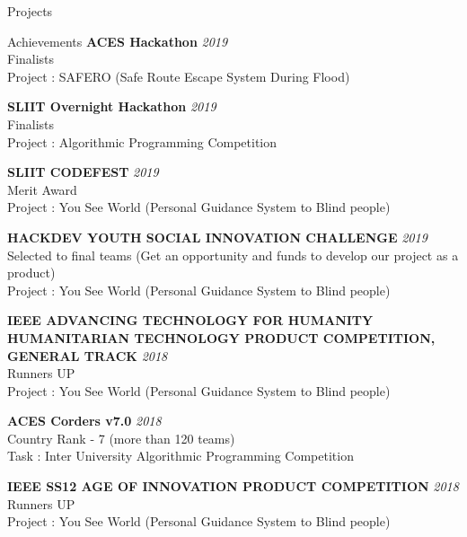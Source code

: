 \documentclass{resume} %
\begin{document}
\begin{rSection}{Projects}
\begin{rSection}{Achievements}
{\bf ACES Hackathon } \hfill {\em 2019}
\\Finalists
\\Project : SAFERO (Safe Route Escape System During Flood)

{\bf SLIIT Overnight Hackathon } \hfill {\em 2019}
\\Finalists
\\Project : Algorithmic Programming Competition

{\bf SLIIT CODEFEST } \hfill {\em 2019}
\\Merit Award
\\Project : You See World (Personal Guidance System to Blind people)

{\bf HACKDEV YOUTH SOCIAL INNOVATION CHALLENGE } \hfill {\em 2019}
\\Selected to final teams (Get an opportunity and funds to develop our project as a product)
\\Project : You See World (Personal Guidance System to Blind people)

{\bf IEEE ADVANCING TECHNOLOGY FOR HUMANITY HUMANITARIAN TECHNOLOGY PRODUCT COMPETITION, GENERAL TRACK } \hfill {\em 2018}
\\Runners UP
\\Project : You See World (Personal Guidance System to Blind people)

{\bf ACES Corders v7.0 } \hfill {\em 2018}
\\Country Rank - 7 (more than 120 teams)
\\Task : Inter University Algorithmic Programming Competition

{\bf IEEE SS12 AGE OF INNOVATION PRODUCT COMPETITION} \hfill {\em 2018}
\\Runners UP
\\Project : You See World (Personal Guidance System to Blind people)

\end{rSection}



\end{rSection}
\end{document}
